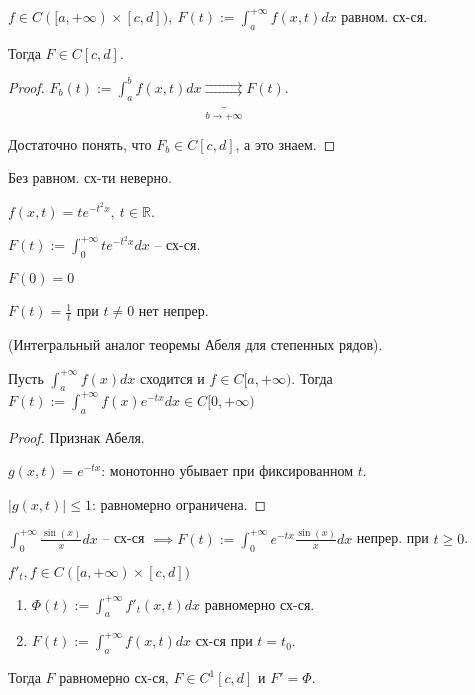 \begin{theorem}
    $f \in C([a, +\infty) \times [c, d]), \ F(t) := \int_{a}^{+\infty} { f(x, t) dx }$ равном. сх-ся.

    Тогда $F \in C[c, d]$.
\end{theorem}
\begin{proof}
    $F_b(t) := \int_{a}^{b} { f(x, t) dx } \underbrace{\rightrightarrows}_{b \rightarrow +\infty} F(t)$.

    Достаточно понять, что $F_b \in C[c, d]$, а это знаем.
\end{proof}

\begin{remark}
    Без равном. сх-ти неверно.

    $f(x, t) = t e^{-t^2 x}, \ t \in \mathbb{R}$.

    $F(t) := \int_{0}^{+\infty} { t e^{-t^2 x} dx }$ -- сх-ся.

    $F(0) = 0$

    $F(t) = \frac{1}{t}$ при $t \not = 0$ нет непрер.
\end{remark}

\begin{theorem}
    (Интегральный аналог теоремы Абеля для степенных рядов).

    Пусть $\int_{a}^{+\infty} { f(x) dx }$ сходится и $f \in C[a, +\infty)$. Тогда $F(t) := \int_{a}^{+\infty} { f(x) e^{-tx} dx } \in C[0, +\infty)$
\end{theorem}

\begin{proof}
    Признак Абеля.

    $g(x, t) = e^{-tx}$: монотонно убывает при фиксированном $t$.
    
    $|g(x, t)| \leq 1$: равномерно ограничена.
\end{proof}

\begin{example}
    $\int_{0}^{+\infty} { \frac{\sin(x)}{x} dx }$ -- сх-ся $\implies F(t) := \int_{0}^{+\infty} { e^{-tx} \frac{\sin(x)}{x} dx }$ непрер. при $t \geq 0$.
\end{example}

\begin{theorem}
    $f'_t, f \in C([a, +\infty) \times [c, d])$

    \begin{enumerate}
        \item {
            $\Phi(t) := \int_{a}^{+\infty} { f'_t (x, t) dx }$ равномерно сх-ся.
        }
        \item {
            $F(t) := \int_{a}^{+\infty} { f(x, t) dx }$ сх-ся при $t = t_0$.
        }
    \end{enumerate}

    Тогда $F$ равномерно сх-ся, $F \in C^1[c, d]$ и $F' = \Phi$.
\end{theorem}

